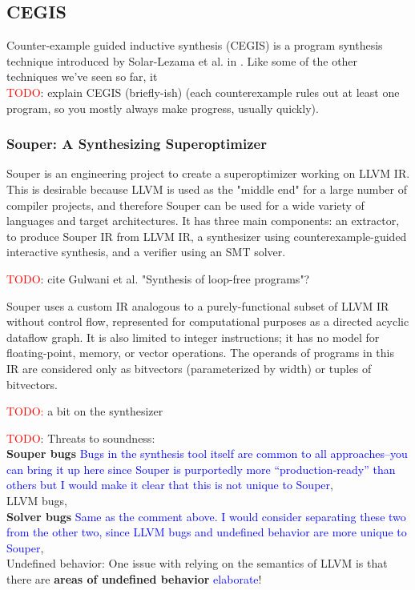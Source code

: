 \documentclass[12pt,twoside]{reedthesis}
\newcommand{\red}[1]{\textcolor{red}{#1}}
\newcommand{\comment}[2]{\textbf{#1} \textcolor{blue}{#2}}
\begin{document}
            \subsection{CEGIS}
            Counter-example guided inductive synthesis (CEGIS) is a program synthesis technique introduced by Solar-Lezama et al. in \cite{solar-lezama2006sketch}.
            Like some of the other techniques we've seen so far, it
            \\  \red{TODO}: explain CEGIS (briefly-ish) (each counterexample rules out at least one program, so you mostly always make progress, usually quickly).

        \subsubsection{Souper: A Synthesizing Superoptimizer}
            Souper \cite{sasnauskas2017souper} is an engineering project to create a superoptimizer working on LLVM IR.
            This is desirable because LLVM is used as the "middle end" for a large number of compiler projects, and therefore Souper can be used for a wide variety of languages and target architectures.
            It has three main components:
                an extractor, to produce Souper IR from LLVM IR,
                a synthesizer using counterexample-guided interactive synthesis,
                and a verifier using an SMT solver.
                
            \red{TODO}: cite Gulwani et al. "Synthesis of loop-free programs"?
                
            Souper uses a custom IR analogous to a purely-functional subset of LLVM IR without control flow\footnotemark, represented for computational purposes as a directed acyclic dataflow graph.
            It is also limited to integer instructions; it has no model for floating-point, memory, or vector operations.
            The operands of programs in this IR are considered only as bitvectors (parameterized by width) or tuples of bitvectors.
                
                
            \red{TODO:} a bit on the synthesizer
            
            \red{TODO}: Threats to soundness:
            \\ \comment{Souper bugs}{Bugs in the synthesis tool itself are common to all approaches--you can bring it up here since Souper is purportedly more ``production-ready'' than others but I would make it clear that this is not unique to Souper},
            \\ LLVM bugs,
            \\ \comment{Solver bugs}{Same as the comment above. I would consider separating these two from the other two, since LLVM bugs and undefined behavior are more unique to Souper},
            \\ Undefined behavior: One issue with relying on the semantics of LLVM is that there are \comment{areas of undefined behavior}{elaborate}!
\end{document}
